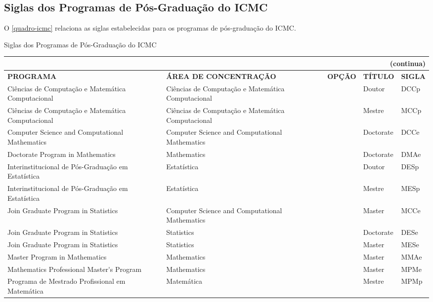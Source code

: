 \begin{apendicesenv}
\chapter{Siglas dos Programas de Pós-Graduação do ICMC}
O \autoref{quadro-icmc} relaciona as siglas estabelecidas para os programas de pós-graduação do ICMC.
\begin{quadro}[htb]
\ABNTEXfontereduzida
\caption[Siglas dos Programas de Pós-Graduação do ICMC]{Siglas dos Programas de Pós-Graduação do ICMC}
\label{quadro-icmc}
\begin{tabular}{|p{3.5cm}|p{3.5cm}|p{3.5cm}|p{1.5cm}|p{2.25cm}|}
  \multicolumn{5}{r}{{(continua)}} \\ 
  \hline
   \textbf{PROGRAMA} & \textbf{ÁREA DE CONCENTRAÇÃO} & \textbf{OPÇÃO} & \textbf{TÍTULO} & \textbf{SIGLA}  \\
    \hline
		Ciências de Computação e Matemática Computacional	& Ciências de Computação e Matemática Computacional	&   &	Doutor	 & DCCp\\
    Ciências de Computação e Matemática Computacional	& Ciências de Computação e Matemática Computacional	&   &	Mestre	& MCCp\\
		Computer Science and Computational Mathematics & Computer Science and Computational Mathematics	&   &	Doctorate & DCCe\\
		Doctorate Program in Mathematics & Mathematics &   &	Doctorate & DMAe\\
		Interinstitucional de Pós-Graduação em Estatística & Estatística &  & Doutor	 & DESp\\
		Interinstitucional de Pós-Graduação em Estatística & Estatística &  & Mestre & MESp\\
		Join Graduate Program in Statistics & Computer Science and Computational Mathematics &  & Master & MCCe\\
		Join Graduate Program in Statistics & Statistics &  & Doctorate & 	DESe\\
    Join Graduate Program in Statistics & Statistics &  & Master & MESe\\
		Master Program in Mathematics &	Mathematics &  & Master &	MMAe\\
		Mathematics Professional Master\'{}s Program &	Mathematics &	 & Master &	MPMe\\
		Programa de Mestrado Profissional em Matemática & Matemática &  & Mestre & MPMp\\
		\end{tabular}
\end{quadro}


\end{apendicesenv}
